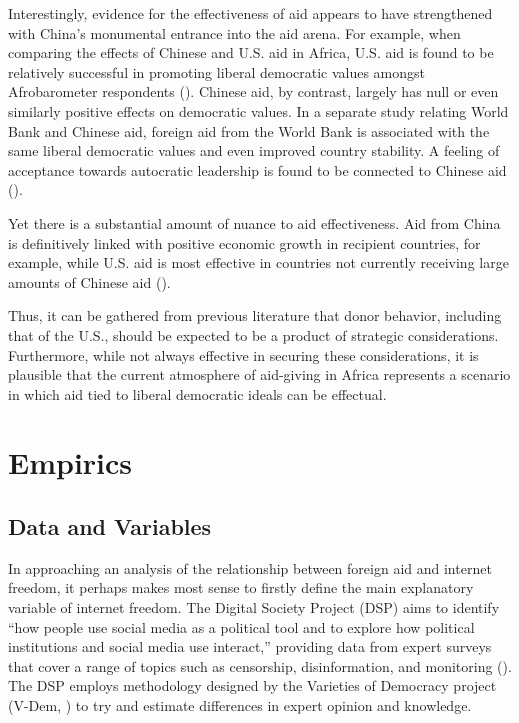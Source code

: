 Interestingly, evidence for the effectiveness of aid appears to have strengthened with China's monumental entrance into the aid arena. For example, when comparing the effects of Chinese and U.S. aid in Africa, U.S. aid is found to be relatively successful in promoting liberal democratic values amongst Afrobarometer respondents (\cite{blair2022}). Chinese aid, by contrast, largely has null or even similarly positive effects on democratic values. In a separate study relating World Bank and Chinese aid, foreign aid from the World Bank is associated with the same liberal democratic values and even improved country stability. A feeling of acceptance towards autocratic leadership is found to be connected to Chinese aid (\cite{gehring2022}).

Yet there is a substantial amount of nuance to aid effectiveness. Aid from China is definitively linked with positive economic growth in recipient countries, for example, while U.S. aid is most effective in countries not currently receiving large amounts of Chinese aid (\cite{dreher2021}).

Thus, it can be gathered from previous literature that donor behavior, including that of the U.S., should be expected to be a product of strategic considerations. Furthermore, while not always effective in securing these considerations, it is plausible that the current atmosphere of aid-giving in Africa represents a scenario in which aid tied to liberal democratic ideals can be effectual. 

\section*{Empirics}
\subsection*{Data and Variables}
In approaching an analysis of the relationship between foreign aid and internet freedom, it perhaps makes most sense to firstly define the main explanatory variable of internet freedom. The Digital Society Project (DSP) aims to identify ``how people use social media as a political tool and to explore how political institutions and social media use interact,'' providing data from expert surveys that cover a range of topics such as censorship, disinformation, and monitoring (\cite{mechkova2022}). The DSP employs methodology designed by the Varieties of Democracy project (V-Dem, \cite{coppedge2022}) to try and estimate differences in expert opinion and knowledge.

